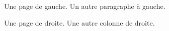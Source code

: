 \begin{pages}
  \begin{Leftside}
    \beginnumbering
    \pstart
    Une page de gauche.
    \pend
    \pstart
    Un autre paragraphe à gauche.
    \pend
    \endnumbering
  \end{Leftside}
  \begin{Rightside}
    \beginnumbering
    \pstart
    Une page de droite.
    \pend
    \pstart
    Une autre colonne de droite.
    \pend
    \endnumbering
  \end{Rightside}
\end{pages}
\Pages
